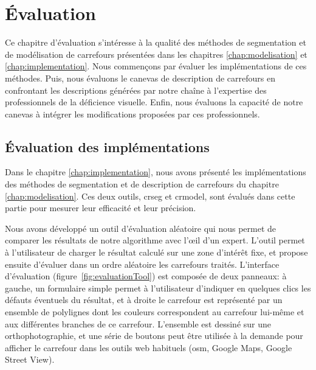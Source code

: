 \chapter{Évaluation}
\label{chap:evaluation}

Ce chapitre d'évaluation s'intéresse à la qualité des méthodes de segmentation et de modélisation de carrefours présentées dans les chapitres \ref{chap:modelisation} et \ref{chap:implementation}. Nous commençons par évaluer les implémentations de ces méthodes. Puis, nous évaluons le canevas de description de carrefours en confrontant les descriptions générées par notre chaîne à l'expertise des professionnels de la déficience visuelle. Enfin, nous évaluons la capacité de notre canevas à intégrer les modifications proposées par ces professionnels.

\section{Évaluation des implémentations}

\label{sec:evaluation_implementation}

Dans le chapitre \ref{chap:implementation}, nous avons présenté les implémentations des méthodes de segmentation et de description de carrefours du chapitre \ref{chap:modelisation}. Ces deux outils, crseg et crmodel, sont évalués dans cette partie pour mesurer leur efficacité et leur précision.

\newpar{}

Nous avons développé un outil d'évaluation aléatoire qui nous permet de comparer les résultats de notre algorithme avec l'œil d'un expert. L'outil permet à l'utilisateur de charger le résultat calculé sur une zone d'intérêt fixe, et propose ensuite d'évaluer dans un ordre aléatoire les carrefours traités. L'interface d'évaluation (figure~\ref{fig:evaluationTool}) est composée de deux panneaux: à gauche, un formulaire simple permet à l'utilisateur d'indiquer en quelques clics les défauts éventuels du résultat, et à droite le carrefour est représenté par un ensemble de polylignes dont les couleurs correspondent au carrefour lui-même et aux différentes branches de ce carrefour. L'ensemble est dessiné sur une orthophotographie, et une série de boutons peut être utilisée à la demande pour afficher le carrefour dans les outils web habituels (\gls{osm}, Google Maps, Google Street View).

